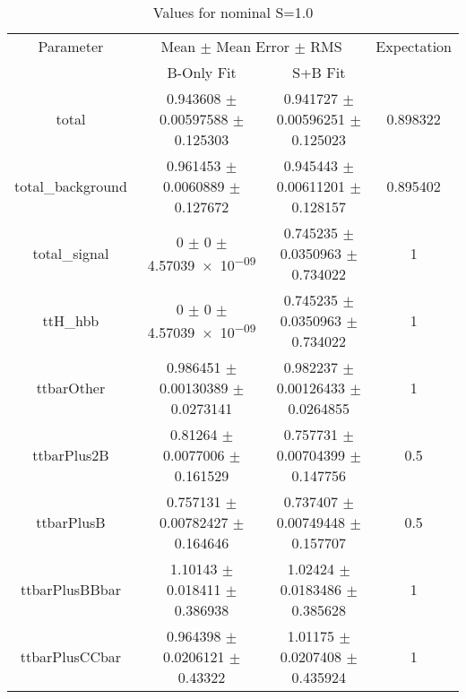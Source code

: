 \begin{table}
\centering
\caption{Values for nominal S=1.0}
\begin{tabular}{cccc}
\toprule
Parameter & \multicolumn{2}{c}{Mean $\pm$ Mean Error $\pm$ RMS} & Expectation\\
 & B-Only Fit & S+B Fit & \\
\midrule
total & \num{0.943608} $\pm$ \num{0.00597588} $\pm$ \num{0.125303} & \num{0.941727} $\pm$ \num{0.00596251} $\pm$ \num{0.125023} & \num{0.898322}\\
total\_background & \num{0.961453} $\pm$ \num{0.0060889} $\pm$ \num{0.127672} & \num{0.945443} $\pm$ \num{0.00611201} $\pm$ \num{0.128157} & \num{0.895402}\\
total\_signal & \num{0} $\pm$ \num{0} $\pm$ \num{4.57039e-09} & \num{0.745235} $\pm$ \num{0.0350963} $\pm$ \num{0.734022} & \num{1}\\
ttH\_hbb & \num{0} $\pm$ \num{0} $\pm$ \num{4.57039e-09} & \num{0.745235} $\pm$ \num{0.0350963} $\pm$ \num{0.734022} & \num{1}\\
ttbarOther & \num{0.986451} $\pm$ \num{0.00130389} $\pm$ \num{0.0273141} & \num{0.982237} $\pm$ \num{0.00126433} $\pm$ \num{0.0264855} & \num{1}\\
ttbarPlus2B & \num{0.81264} $\pm$ \num{0.0077006} $\pm$ \num{0.161529} & \num{0.757731} $\pm$ \num{0.00704399} $\pm$ \num{0.147756} & \num{0.5}\\
ttbarPlusB & \num{0.757131} $\pm$ \num{0.00782427} $\pm$ \num{0.164646} & \num{0.737407} $\pm$ \num{0.00749448} $\pm$ \num{0.157707} & \num{0.5}\\
ttbarPlusBBbar & \num{1.10143} $\pm$ \num{0.018411} $\pm$ \num{0.386938} & \num{1.02424} $\pm$ \num{0.0183486} $\pm$ \num{0.385628} & \num{1}\\
ttbarPlusCCbar & \num{0.964398} $\pm$ \num{0.0206121} $\pm$ \num{0.43322} & \num{1.01175} $\pm$ \num{0.0207408} $\pm$ \num{0.435924} & \num{1}\\
\bottomrule
\end{tabular}
\end{table}